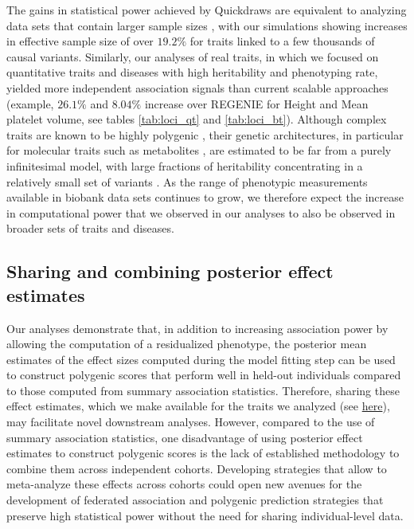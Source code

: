 The gains in statistical power achieved by Quickdraws are equivalent to analyzing data sets that contain larger sample sizes \cite{yang2011genomic,loh2015efficient,loh2018mixed}, with our simulations showing increases in effective sample size of over $19.2\%$ for traits linked to a few thousands of causal variants.
%
Similarly, our analyses of real traits, in which we focused on quantitative traits and diseases with high heritability and phenotyping rate, yielded more independent association signals than current scalable approaches (example, $26.1\%$ and $8.04\%$ increase over REGENIE for Height and Mean platelet volume, see tables \ref{tab:loci_qt} and \ref{tab:loci_bt}).
%
Although complex traits are known to be highly polygenic \cite{yengo2022saturated}, their genetic architectures, in particular for molecular traits such as metabolites \cite{kettunen2012genome}, are estimated to be far from a purely infinitesimal model, with large fractions of heritability concentrating in a relatively small set of variants \cite{stahl2012bayesian,zeng2018signatures,weissbrod2020functionally}.
%
As the range of phenotypic measurements available in biobank data sets continues to grow, we therefore expect the increase in computational power that we observed in our analyses to also be observed in broader sets of traits and diseases.
%

\subsection{Sharing and combining posterior effect estimates}

Our analyses demonstrate that, in addition to increasing association power by allowing the computation of a residualized phenotype, the posterior mean estimates of the effect sizes computed during the model fitting step can be used to construct polygenic scores that perform well in held-out individuals compared to those computed from summary association statistics.
%
Therefore, sharing these effect estimates, which we make available for the traits we analyzed (see \href{https://www.stats.ox.ac.uk/publication-data/sge/ppg/quickdraws/}{here}), may facilitate novel downstream analyses.
%
However, compared to the use of summary association statistics, one disadvantage of using posterior effect estimates to construct polygenic scores is the lack of established methodology to combine them across independent cohorts.
%
Developing strategies that allow to meta-analyze these effects across cohorts could open new avenues for the development of federated association and polygenic prediction strategies that preserve high statistical power without the need for sharing individual-level data.
%

